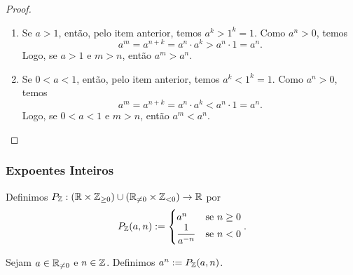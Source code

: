 \begin{proof}
\begin{enumerate}[leftmargin=*, align=left, label=\textbf{(\alph*)}]
\begin{enumerate}[label=\roman*.]
                    \item Se $a > 1$, então, pelo item anterior, temos $a^k > 1^k = 1$. Como $a^n > 0$, temos
                        \[
                            a^m = a^{n+k} = a^n \cdot a^k > a^n \cdot 1 = a^n.
                        \]
                    Logo, se $a > 1$ e $m > n$, então $a^m > a^n$.
                    \item Se $0 < a < 1$, então, pelo item anterior, temos $a^k < 1^k = 1$. Como $a^n > 0$, temos
                        \[
                            a^m = a^{n+k} = a^n \cdot a^k < a^n \cdot 1 = a^n.
                        \]
                    Logo, se $0 < a < 1$ e $m > n$, então $a^m < a^n$.
                \end{enumerate}
            \blackproof
        \end{enumerate}
\end{proof}

\subsubsection{Expoentes Inteiros}

\begin{definition}
    Definimos $P_{\mathbb{Z}} : (\mathbb{R} \times \mathbb{Z}_{\geq 0}) \cup (\mathbb{R}_{\neq 0} \times \mathbb{Z}_{<0}) \to \mathbb{R}$ por
        \[
            P_{\mathbb{Z}}(a,n) :=
                \begin{cases}
                    a^n & \text{se } n \geq 0 \\
                    \dfrac{1}{a^{-n}} & \text{se } n < 0
                \end{cases}.
        \]
\end{definition}

\begin{definition}
    Sejam $a \in \mathbb{R}_{\neq 0}$ e $n \in \mathbb{Z}$. Definimos $a^n := P_{\mathbb{Z}}(a,n)$.
\end{definition}


